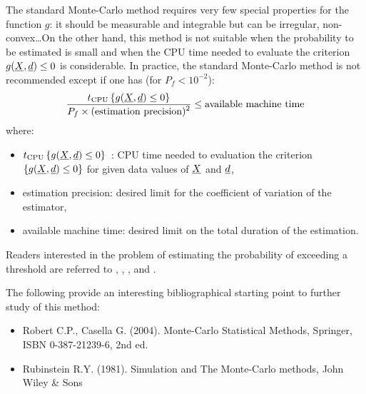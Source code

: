 {
  The standard Monte-Carlo method requires very few special properties for the function $g$: it should be measurable and integrable but can be irregular, non-convex\ldots On the other hand, this method is not suitable when the probability to be estimated is small and when the CPU time needed to evaluate the criterion $g({\underline{X}},{\underline{d}}) \leq 0$ is considerable. In practice, the standard Monte-Carlo method is not recommended except if one has (for $P_f < 10^{-2}$):
  $$
  \frac{ \displaystyle t_\textrm{CPU} \left\{ g({\underline{X}},{\underline{d}}) \leq 0 \right\} }{ \displaystyle P_f \times (\textrm{estimation precision})^2 } \leq \textrm{available machine time}
  $$
  where:
  \begin{itemize}
  \item $t_\textrm{CPU} \left\{ g({\underline{X}},{\underline{d}}) \leq 0 \right\}$~: CPU time needed to evaluation the criterion $\left\{ g({\underline{X}},{\underline{d}}) \leq 0 \right\}$ for given data values of ${\underline{X}}$ and ${\underline{d}}$,
  \item estimation precision: desired limit for the coefficient of variation of the estimator,
  \item available machine time: desired limit on the total duration of the estimation.
  \end{itemize}

  Readers interested in the problem of estimating the probability of exceeding a threshold are referred to , , ,  and .

  The following provide an interesting bibliographical starting point to further study of this method:
  \begin{itemize}
  \item Robert C.P., Casella G. (2004). Monte-Carlo Statistical Methods, Springer, ISBN 0-387-21239-6, 2nd ed.
  \item Rubinstein R.Y. (1981). Simulation and The Monte-Carlo methods, John Wiley \& Sons
  \end{itemize}
}
